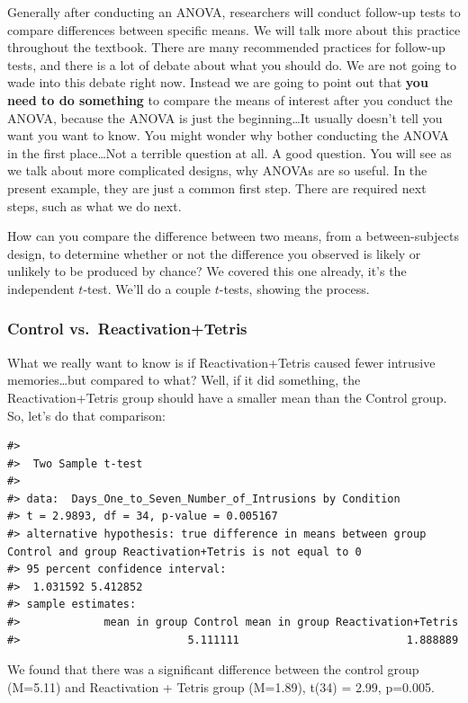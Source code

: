 \documentclass[
  letterpaper,
  DIV=11,
  numbers=noendperiod]{scrreprt}
\begin{document}
Generally after conducting an ANOVA, researchers will conduct follow-up
tests to compare differences between specific means. We will talk more
about this practice throughout the textbook. There are many recommended
practices for follow-up tests, and there is a lot of debate about what
you should do. We are not going to wade into this debate right now.
Instead we are going to point out that \textbf{you need to do something}
to compare the means of interest after you conduct the ANOVA, because
the ANOVA is just the beginning\ldots It usually doesn't tell you want
you want to know. You might wonder why bother conducting the ANOVA in
the first place\ldots Not a terrible question at all. A good question.
You will see as we talk about more complicated designs, why ANOVAs are
so useful. In the present example, they are just a common first step.
There are required next steps, such as what we do next.

How can you compare the difference between two means, from a
between-subjects design, to determine whether or not the difference you
observed is likely or unlikely to be produced by chance? We covered this
one already, it's the independent \(t\)-test. We'll do a couple
\(t\)-tests, showing the process.

\subsubsection{Control
vs.~Reactivation+Tetris}\label{control-vs.-reactivationtetris}

What we really want to know is if Reactivation+Tetris caused fewer
intrusive memories\ldots but compared to what? Well, if it did
something, the Reactivation+Tetris group should have a smaller mean than
the Control group. So, let's do that comparison:

\begin{verbatim}
#> 
#>  Two Sample t-test
#> 
#> data:  Days_One_to_Seven_Number_of_Intrusions by Condition
#> t = 2.9893, df = 34, p-value = 0.005167
#> alternative hypothesis: true difference in means between group Control and group Reactivation+Tetris is not equal to 0
#> 95 percent confidence interval:
#>  1.031592 5.412852
#> sample estimates:
#>             mean in group Control mean in group Reactivation+Tetris 
#>                          5.111111                          1.888889
\end{verbatim}

We found that there was a significant difference between the control
group (M=5.11) and Reactivation + Tetris group (M=1.89), t(34) = 2.99,
p=0.005.
\end{document}
